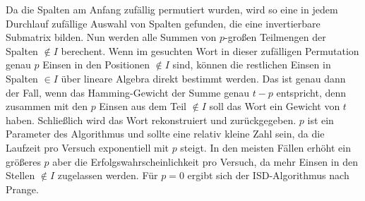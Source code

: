 \documentclass[a4paper,10pt,ngerman]{scrartcl}
\begin{document}
Da die Spalten am Anfang zufällig permutiert wurden, wird so eine in jedem Durchlauf zufällige Auswahl von Spalten gefunden, die eine invertierbare Submatrix bilden. 
Nun werden alle Summen von $p$-großen Teilmengen der Spalten $\notin I$ berechent. 
Wenn im gesuchten Wort in dieser zufälligen Permutation genau $p$ Einsen in den Positionen $\notin I$ sind, können die restlichen Einsen in Spalten $\in I$ über lineare Algebra direkt bestimmt werden. 
Das ist genau dann der Fall, wenn das Hamming-Gewicht der Summe genau $t-p$ entspricht, denn zusammen mit den $p$ Einsen aus dem Teil $\notin I$ soll das Wort ein Gewicht von $t$ haben. 
Schließlich wird das Wort rekonstruiert und zurückgegeben. 
$p$ ist ein Parameter des Algorithmus und sollte eine relativ kleine Zahl sein, da die Laufzeit pro Versuch exponentiell mit $p$ steigt. In den meisten Fällen erhöht ein größeres $p$ aber die Erfolgswahrscheinlichkeit pro Versuch, da mehr Einsen in den Stellen $\notin I$ zugelassen werden. Für $p=0$ ergibt sich der ISD-Algorithmus nach Prange.
\end{document}
